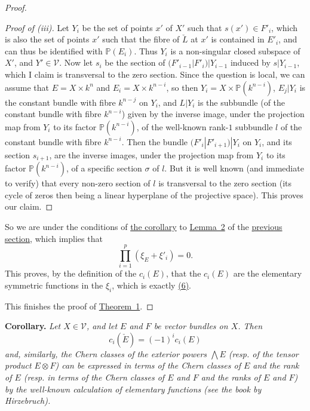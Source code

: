 \documentclass{article}
\newenvironment{itenv}[1]
  {\phantomsection\par\medskip\noindent\textbf{#1.}\itshape}
  {\par\medskip}
\renewcommand{\cal}[1]{{\mathcal{#1}}}
\newcommand{\oldpage}[1]{\marginpar{\footnotesize$\Big\vert$ \textit{p.~#1}}}
\begin{document}
\begin{proof}
\begin{proof}[Proof of \rm{(iii)}]
    Let $Y_i$ be the set of points $x'$ of $X'$ such that $s(x')\in F'_i$, which is also the set of points $x'$ such that the fibre of $\check{L}$ at $x'$ is contained in $E'_i$, and can thus be identified with $\mathbb{P}(E_i)$.
    Thus $Y_i$ is a non-singular closed subspace of $X'$, and $Y'\in\cal{V}$.
    Now let $s_i$ be the section of $(F'_{i-1}|F'_i)|Y_{i-1}$ induced by $s|Y_{i-1}$, which I claim is transversal to the zero section.
    Since the question is local, we
\oldpage{147}
    can assume that $E=X\times k^n$ and $E_i=X\times k^{n-i}$, so then $Y_i=X\times\mathbb{P}(k^{n-i})$, $E_j|Y_i$ is the constant bundle with fibre $k^{n-j}$ on $Y_i$, and $L|Y_i$ is the subbundle (of the constant bundle with fibre $k^{n-i}$) given by the inverse image, under the projection map from $Y_i$ to its factor $\mathbb{P}(k^{n-i})$, of the well-known rank-$1$ subbundle $l$ of the constant bundle with fibre $k^{n-i}$.
    Then the bundle $(F'_i|F'_{i+1})|Y_i$ on $Y_i$, and its section $s_{i+1}$, are the inverse images, under the projection map from $Y_i$ to its factor $\mathbb{P}(k^{n-i})$, of a specific section $\sigma$ of $l$.
    But it is well known (and immediate to verify) that every non-zero section of $l$ is transversal to the zero section (its cycle of zeros then being a linear hyperplane of the projective space).
    This proves our claim.
  \end{proof}

  So we are under the conditions of \hyperref[lemma2corollary]{the corollary} to \hyperref[lemma2]{Lemma~2} of the \hyperref[section2]{previous section}, which implies that
  \[
    \prod_{i=1}^p (\xi_E+\xi'_i) = 0.
  \]
  This proves, by the definition of the $c_i(E)$, that the $c_i(E)$ are the elementary symmetric functions in the $\xi_i$, which is exactly \hyperref[equation6]{(6)}.

  This finishes the proof of \hyperref[theorem1]{Theorem~1}.
\end{proof}

\begin{itenv}{Corollary}
\label{theorem1corollary}
  Let $X\in\cal{V}$, and let $E$ and $F$ be vector bundles on $X$.
  Then
  \[
  \label{equation7}
    c_i(\check{E}) = (-1)^i c_i(E)
  \tag{7}
  \]
  and, similarly, the Chern classes of the exterior powers $\bigwedge E$ (resp. of the tensor product $E\otimes F$) can be expressed in terms of the Chern classes of $E$ and the rank of $E$ (resp. in terms of the Chern classes of $E$ and $F$ and the ranks of $E$ and $F$) by the well-known calculation of elementary functions (see the book by Hirzebruch).
\end{itenv}
\end{document}
